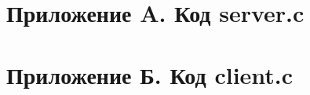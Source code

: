 \setcounter{secnumdepth}{-1}

\section{Приложение A. Код server.c}

\newpage

\section{Приложение Б. Код client.c}

\newpage